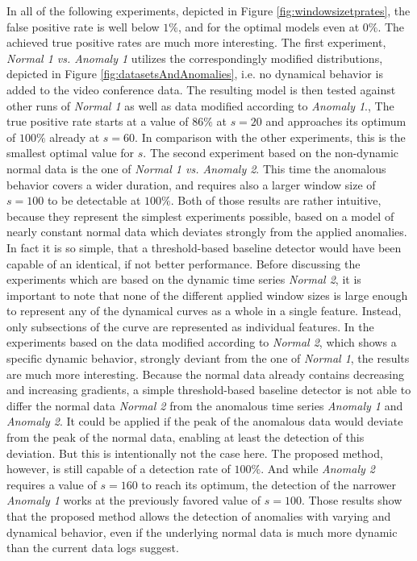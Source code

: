 \documentclass{llncs}
\begin{document}
In all of the following experiments, depicted in Figure \ref{fig:windowsizetprates}, the false positive rate is well below $1\%$, and for the optimal models even at $0\%$. The achieved true positive rates are much more interesting. The first experiment, \textit{Normal 1 vs. Anomaly 1} utilizes the correspondingly modified distributions, depicted in Figure \ref{fig:datasetsAndAnomalies}, i.e. no dynamical behavior is added to the video conference data. The resulting model is then tested against other runs of \textit{Normal 1} as well as data modified according to \textit{Anomaly 1}., The true positive rate starts at a value of $86\%$ at $s=20$ and approaches its optimum of $100\%$ already at $s=60$. In comparison with the other experiments, this is the smallest optimal value for $s$. The second experiment based on the non-dynamic normal data is the one of \textit{Normal 1 vs. Anomaly 2}. This time the anomalous behavior covers a wider duration, and requires also a larger window size of $s=100$ to be detectable at $100\%$. Both of those results are rather intuitive, because they represent the simplest experiments possible, based on a model of nearly constant normal data which deviates strongly from the applied anomalies. In fact it is so simple, that a threshold-based baseline detector would have been capable of an identical, if not better performance.
Before discussing the experiments which are based on the dynamic time series \textit{Normal 2}, it is important to note that none of the different applied window sizes is large enough to represent any of the dynamical curves as a whole in a single feature. Instead, only subsections of the curve are represented as individual features.
In the experiments based on the data modified according to \textit{Normal 2}, which shows a specific dynamic behavior, strongly deviant from the one of \textit{Normal 1}, the results are much more interesting. Because the normal data already contains decreasing and increasing gradients, a simple threshold-based baseline detector is not able to differ the normal data \textit{Normal 2} from the anomalous time series \textit{Anomaly 1} and \textit{Anomaly 2}. It could be applied if the peak of the anomalous data would deviate from the peak of the normal data, enabling at least the detection of this deviation. But this is intentionally not the case here. The proposed method, however, is still capable of a detection rate of $100\%$. And while \textit{Anomaly 2} requires a value of $s=160$ to reach its optimum, the detection of the narrower \textit{Anomaly 1} works at the previously favored value of $s=100$. Those results show that the proposed method allows the detection of anomalies with varying and dynamical behavior, even if the underlying normal data is much more dynamic than the current data logs suggest.
\end{document}
